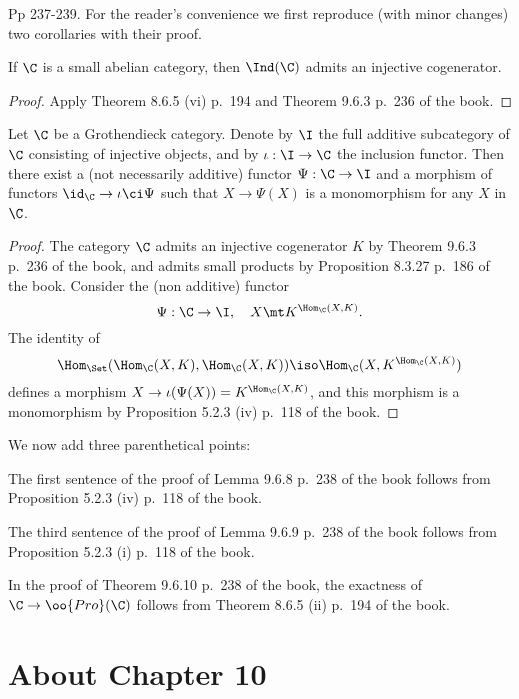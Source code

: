 \documentclass[12pt]{article}
\theoremstyle{remark}
\theoremstyle{definition}
\begin{document}

\begin{s}
Pp 237-239. For the reader's convenience we first reproduce (with minor changes) two corollaries with their proof. 

\begin{cor}[Corollary 9.6.5 p. 237]
If $\C$ is a small abelian category, then $\Ind(\C)$ admits an injective cogenerator.
\end{cor}

\begin{proof}
Apply Theorem 8.6.5 (vi) p.~194 and Theorem 9.6.3 p.~236 of the book.
\end{proof}

\begin{cor}[Corollary 9.6.6 p. 237]
Let $\C$ be a Grothendieck category. Denote by $\I$ the full additive subcategory of $\C$ consisting of injective objects, and by $\iota:\I\to\C$ the inclusion functor. Then there exist a (not necessarily additive) functor $\Psi:\C\to\I$ and a morphism of functors $\id_\C\to\iota\ci\Psi$ such that $X\to\Psi(X)$ is a monomorphism for any $X$ in $\C$.
\end{cor}

\begin{proof}
The category $\C$ admits an injective cogenerator $K$ by Theorem 9.6.3 p.~236 of the book, and admits small products by Proposition 8.3.27 p.~186 of the book. Consider the (non additive) functor 
$$
\Psi:\C\to\I,\quad X\mt K^{\Hom_\C(X,K)}.
$$ 
The identity of 
$$
\Hom_{\Set}(\Hom_\C(X,K),\Hom_\C(X,K))\iso\Hom_\C(X,K^{\Hom_\C(X,K)})
$$ 
defines a morphism $X\to\iota(\Psi(X))=K^{\Hom_\C(X,K)}$, and this morphism is a monomorphism by Proposition 5.2.3 (iv) p.~118 of the book. 
\end{proof}

We now add three parenthetical points: 

The first sentence of the proof of Lemma 9.6.8 p.~238 of the book follows from Proposition 5.2.3 (iv) p.~118 of the book. 

The third sentence of the proof of Lemma 9.6.9 p.~238 of the book follows from Proposition 5.2.3 (i) p.~118 of the book. 

In the proof of Theorem 9.6.10 p.~238 of the book, the exactness of $\C\to\oo{Pro}(\C)$ follows from Theorem 8.6.5 (ii) p.~194 of the book.
\end{s}


\section{About Chapter 10}
\end{document}
